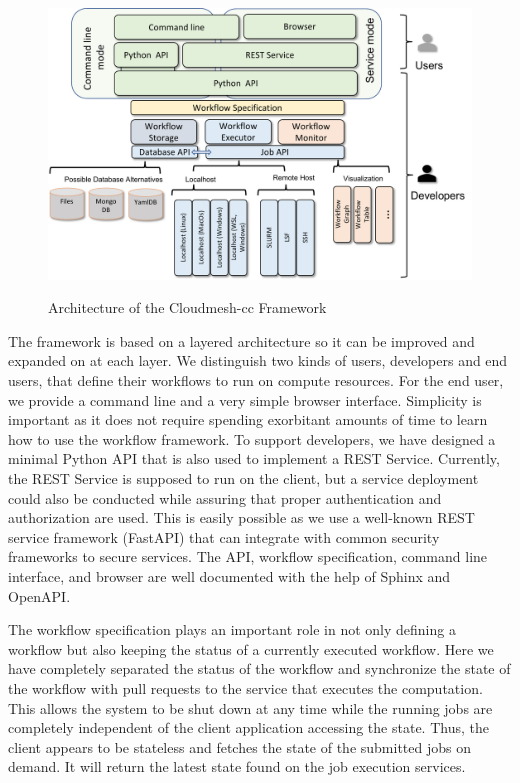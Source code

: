 \documentclass[sigplan,screen]{acmart}
\begin{document}
\begin{figure}[htb]
{\centering
\includegraphics[width=1.0\columnwidth]{./images/cloudmesh-cc-arch.pdf}
}
\caption{Architecture of the Cloudmesh-cc Framework}\label{fig:arch}
\end{figure}



The framework is based on a layered architecture so it can be improved
and expanded on at each layer. We distinguish two kinds of users,
developers and end users, that define their workflows to run on
compute resources. For the end user, we provide a command line and a
very simple browser interface. Simplicity is important as it does not
require spending exorbitant amounts of time to learn how to use the
workflow framework. To support developers, we have designed a minimal
Python API that is also used to implement a REST Service.  Currently,
the REST Service is supposed to run on the client, but a service
deployment could also be conducted while assuring that proper
authentication and authorization are used. This is easily possible as
we use a well-known REST service framework (FastAPI) that can
integrate with common security frameworks to secure services. The API,
workflow specification, command line interface, and browser are well
documented with the help of Sphinx and OpenAPI.

The workflow specification plays an important role in not only
defining a workflow but also keeping the status of a currently
executed workflow. Here we have completely separated the status of the
workflow and synchronize the state of the workflow with pull requests
to the service that executes the computation. This allows the system
to be shut down at any time while the running jobs are completely
independent of the client application accessing the state. Thus, the
client appears to be stateless and fetches the state of the submitted
jobs on demand. It will return the latest state found on the job
execution services.
\end{document}
